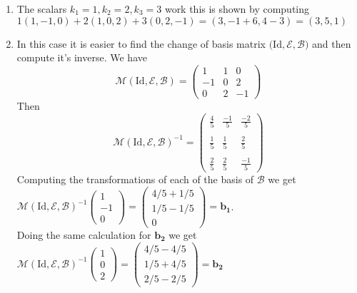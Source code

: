 \documentclass[letter,12pt]{article}
\begin{document}
\begin{enumerate}[label=(\alph*)]
\item The scalars $k_1=1, k_2=2,k_3=3$ work this is shown by computing $1(1,-1,0)+2(1,0,2)+3(0,2,-1)=(3,-1+6,4-3)=(3,5,1)$ 
\item In this case it is easier to find the change of basis matrix $\mathcal (\text{Id},\mathcal{E},\mathcal{B})$ and then compute it's inverse. 
We have 
\[
  \mathcal M (\text{Id},\mathcal{E},\mathcal{B})=\begin{pmatrix} 1& 1 & 0\\ -1 & 0 & 2 \\ 0 & 2 & -1\end{pmatrix}
\]
Then 
\[
  \mathcal M (\text{Id},\mathcal{E},\mathcal{B})^{-1}=\begin{pmatrix} \frac{4}{5}& \frac{-1}{5} & \frac{-2}{5} \\ \\ \frac{1}{5} & \frac{1}{5} & \frac{2}{5} \\ \\ \frac{2}{5} & \frac{2}{5} & \frac{-1}{5}\end{pmatrix}
\] 
Computing the transformations of each of the basis of $\mathcal B$ we get $\mathcal M (\text{Id},\mathcal{E},\mathcal{B})^{-1} \begin{pmatrix} 1 \\ -1 \\ 0 \end{pmatrix}=\begin{pmatrix}
  4/5+1/5\\1/5-1/5\\0 
\end{pmatrix}=\mathbf{b_1}$.
\\ Doing the same calculation for $\mathbf{b_2}$ we get $\mathcal M (\text{Id},\mathcal{E},\mathcal{B})^{-1} \begin{pmatrix} 1 \\ 0 \\ 2 \end{pmatrix}=\begin{pmatrix}
  4/5-4/5\\1/5+4/5\\2/5-2/5 
\end{pmatrix}=\mathbf{b_2}$



\end{enumerate}
\end{document}
